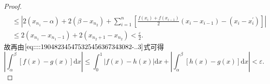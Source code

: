 \documentclass[../../main.tex]{subfiles}
\begin{document}
\begin{proof}
\begin{align*}
\\
&\leqslant \left| 2\left( x_{n_1}-\alpha \right) +2\left( \beta -x_{n_2} \right) +\sum_{i=1}^n{\left[ \frac{f\left( x_i \right) +f\left( x_{i-1} \right)}{2}\left( x_i-x_{i-1} \right) -\left( x_i-x_{i}^{\prime} \right) \right]} \right|
\\
&\leqslant 2\left( x_{n_1}-x_{n_1-1} \right) +2\left( x_{n_2+1}-x_{n_2} \right) <\frac{\varepsilon}{2}.
\end{align*}
故再由\(\eqref{eq::::190482345475325456367343082-..3}\)式可得
\[
\left| \int_{\alpha}^{\beta} \left[ f(x) - g(x) \right] \mathrm{d}x \right| \leqslant \int_0^1 \left| f(x) - h(x) \right| \mathrm{d}x + \left| \int_{\alpha}^{\beta} \left[ h(x) - g(x) \right] \mathrm{d}x \right| < \varepsilon.
\]

\end{proof}
\end{document}
